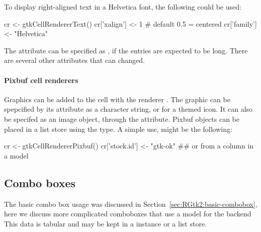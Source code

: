 To display right-aligned text in a Helvetica font, the following could be used:
\begin{Schunk}
\begin{Sinput}
 cr <- gtkCellRendererText()
 cr['xalign'] <- 1                       # default 0.5 = centered
 cr['family'] <- "Helvetica"  
\end{Sinput}
\end{Schunk}
The  attribute can be specified as , if the
entries are expected to be long. There are several other attributes that can
changed. 

\paragraph{Pixbuf cell renderers}
Graphics can be added to the cell with the renderer
. The graphic can be spepcified by
its  attribute as a character string, or
 for a themed icon. It can also be specifed as an
image object, through the  attribute. Pixbuf objects can
be placed in a list store using the  type. A simple use,
might be the following:
\begin{Schunk}
\begin{Sinput}
 cr <- gtkCellRendererPixbuf()
 cr['stock.id'] <- "gtk-ok" ## or from a column in a model
\end{Sinput}
\end{Schunk}




\subsection{Combo boxes}
\label{sec:RGtk2:combobox}

The basic combo box usage was discussed in
Section~\ref{sec:RGtk2:basic-combobox}, here we discuss more
complicated comboboxes that use a model for the backend This data is
tabular and may be kept in a  instance or a
list store.  

